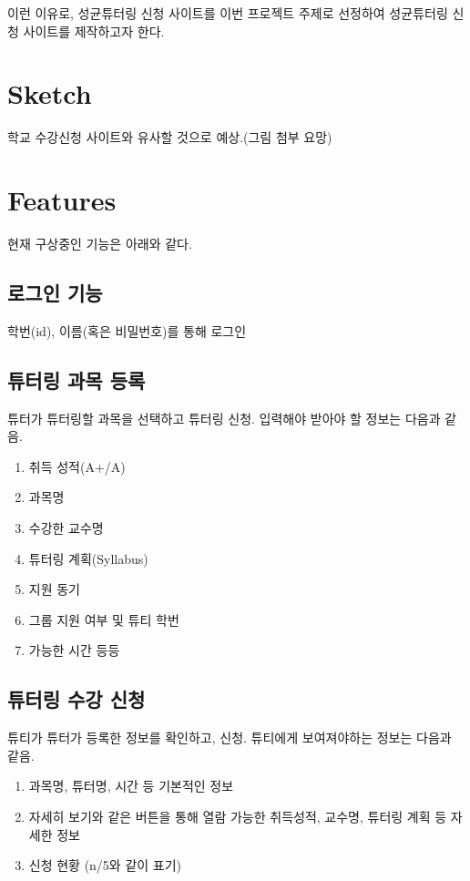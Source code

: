 \documentclass{lxaiproposal}
\begin{document}
이런 이유로, 성균튜터링 신청 사이트를 이번 프로젝트 주제로 선정하여 성균튜터링 신청 사이트를 제작하고자 한다.

\section{Sketch}
\vspace*{-3mm}
학교 수강신청 사이트와 유사할 것으로 예상.(그림 첨부 요망)

\section{Features}
\vspace*{-3mm}

현재 구상중인 기능은 아래와 같다.
\subsection{로그인 기능}
학번(id), 이름(혹은 비밀번호)를 통해 로그인

\subsection{튜터링 과목 등록}
튜터가 튜터링할 과목을 선택하고 튜터링 신청.
입력해야 받아야 할 정보는 다음과 같음.
\begin{enumerate}
    \item 취득 성적(A+/A)
    \item 과목명
    \item 수강한 교수명
    \item 튜터링 계획(Syllabus)
    \item 지원 동기
    \item 그룹 지원 여부 및 튜티 학번
    \item 가능한 시간 등등
\end{enumerate}

\subsection{튜터링 수강 신청}
튜티가 튜터가 등록한 정보를 확인하고, 신청.
튜티에게 보여져야하는 정보는 다음과 같음.
\begin{enumerate}
    \item 과목명, 튜터명, 시간 등 기본적인 정보
    \item 자세히 보기와 같은 버튼을 통해 열람 가능한 취득성적, 교수명, 튜터링 계획 등 자세한 정보
    \item 신청 현황 (n/5와 같이 표기)
\end{enumerate}
\end{document}
